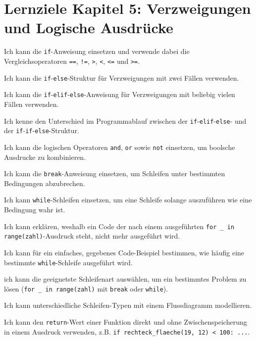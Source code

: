 \section{Lernziele Kapitel 5: Verzweigungen und Logische Ausdrücke}
\begin{todolist}
    \item Ich kann die \lstinline|if|-Anweisung einsetzen und verwende dabei die Vergleichsoperatoren \lstinline|==|, \lstinline|!=|, \lstinline|>|, \lstinline|<|, \lstinline|<=| und \lstinline|>=|.
    \item Ich kann die \lstinline|if|-\lstinline|else|-Struktur für Verzweigungen mit zwei Fällen verwenden.
    \item Ich kann die \lstinline|if|-\lstinline|elif|-\lstinline|else|-Anweisung für Verzweigungen mit beliebig vielen Fällen verwenden.
    \item Ich kenne den Unterschied im Programmablauf zwischen der \lstinline|if|-\lstinline|elif|-\lstinline|else|- und der \lstinline|if|-\lstinline|if|-\lstinline|else|-Struktur.
    \item Ich kann die logischen Operatoren \lstinline|and|, \lstinline|or| sowie \lstinline|not| einsetzen, um boolsche Ausdrucke zu kombinieren.
    \item Ich kann die \lstinline|break|-Anweisung einsetzen, um Schleifen unter bestimmten Bedingungen abzubrechen.
    \item Ich kann \lstinline|while|-Schleifen einsetzen, um eine Schleife solange auszuführen wie eine Bedingung wahr ist.
    \item Ich kann erklären, weshalb ein Code der nach einem ausgeführten \lstinline|for _ in range(zahl)|-Ausdruck steht, nicht mehr ausgeführt wird.
    \item Ich kann für ein einfaches, gegebenes Code-Beispiel bestimmen, wie häufig eine bestimmte \lstinline|while|-Schleife ausgeführt wird.
    \item ich kann die geeignetste Schleifenart auswählen, um ein bestimmtes Problem zu lösen (\lstinline|for _ in range(zahl)| mit \lstinline|break| oder \lstinline|while|).
    \item Ich kann unterschiedliche Schleifen-Typen mit einem Flussdiagramm modellieren.
    \item Ich kann den \lstinline|return|-Wert einer Funktion direkt und ohne Zwischenspeicherung in einem Ausdruck verwenden, z.B. \lstinline|if rechteck_flaeche(19, 12) < 100: ...|.
\end{todolist}

